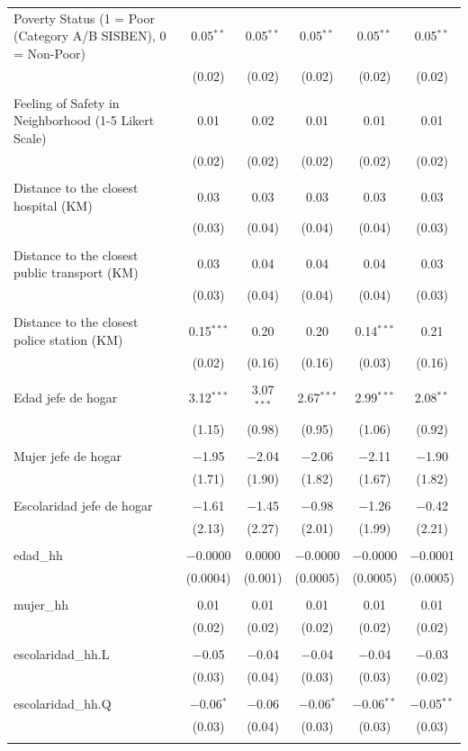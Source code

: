 \begin{table}[H]
\begin{tabularx}{0.9\textwidth}{@{\extracolsep{-7pt}}lccccc}
 Poverty Status (1 = Poor (Category A/B SISBEN), 0 = Non-Poor) & 0.05$^{**}$ & 0.05$^{**}$ & 0.05$^{**}$ & 0.05$^{**}$ & 0.05$^{**}$ \\    & (0.02) & (0.02) & (0.02) & (0.02) & (0.02) \\    & & & & & \\   Feeling of Safety in Neighborhood (1-5 Likert Scale) & 0.01 & 0.02 & 0.01 & 0.01 & 0.01 \\    & (0.02) & (0.02) & (0.02) & (0.02) & (0.02) \\    & & & & & \\   Distance to the closest hospital (KM) & 0.03 & 0.03 & 0.03 & 0.03 & 0.03 \\    & (0.03) & (0.04) & (0.04) & (0.04) & (0.03) \\    & & & & & \\   Distance to the closest public transport  (KM) & 0.03 & 0.04 & 0.04 & 0.04 & 0.03 \\    & (0.03) & (0.04) & (0.04) & (0.04) & (0.03) \\    & & & & & \\   Distance to the closest police station (KM) & 0.15$^{***}$ & 0.20 & 0.20 & 0.14$^{***}$ & 0.21 \\    & (0.02) & (0.16) & (0.16) & (0.03) & (0.16) \\    & & & & & \\   Edad jefe de hogar & 3.12$^{***}$ & 3.07$^{***}$ & 2.67$^{***}$ & 2.99$^{***}$ & 2.08$^{**}$ \\    & (1.15) & (0.98) & (0.95) & (1.06) & (0.92) \\    & & & & & \\   Mujer jefe de hogar & $-$1.95 & $-$2.04 & $-$2.06 & $-$2.11 & $-$1.90 \\    & (1.71) & (1.90) & (1.82) & (1.67) & (1.82) \\    & & & & & \\   Escolaridad jefe de hogar & $-$1.61 & $-$1.45 & $-$0.98 & $-$1.26 & $-$0.42 \\    & (2.13) & (2.27) & (2.01) & (1.99) & (2.21) \\    & & & & & \\   edad\_hh & $-$0.0000 & 0.0000 & $-$0.0000 & $-$0.0000 & $-$0.0001 \\    & (0.0004) & (0.001) & (0.0005) & (0.0005) & (0.0005) \\    & & & & & \\   mujer\_hh & 0.01 & 0.01 & 0.01 & 0.01 & 0.01 \\    & (0.02) & (0.02) & (0.02) & (0.02) & (0.02) \\    & & & & & \\   escolaridad\_hh.L & $-$0.05 & $-$0.04 & $-$0.04 & $-$0.04 & $-$0.03 \\    & (0.03) & (0.04) & (0.03) & (0.03) & (0.02) \\    & & & & & \\   escolaridad\_hh.Q & $-$0.06$^{*}$ & $-$0.06 & $-$0.06$^{*}$ & $-$0.06$^{**}$ & $-$0.05$^{**}$ \\    & (0.03) & (0.04) & (0.03) & (0.03) & (0.03) \\    & & & & & 
\end{tabularx}
\end{table}
